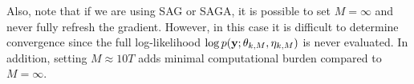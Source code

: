 Also, note that if we are using SAG or SAGA, it is possible to set $M = \infty$ and never fully refresh the gradient. However, in this case it is difficult to determine convergence since the full log-likelihood $\log p(\mathbf{y};\theta_{k,M},\eta_{k,M})$ is never evaluated. In addition, setting $M \approx 10T$ adds minimal computational burden compared to $M = \infty$.

